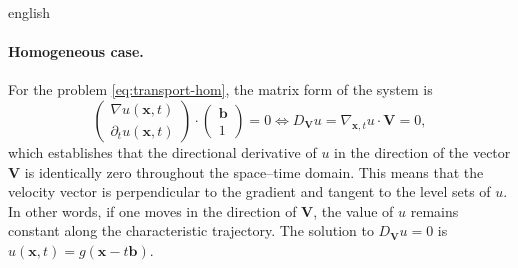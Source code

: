 \documentclass[../0000.tex]{subfiles}
\begin{document}
\begin{hyphenrules}{english}
\paragraph{Homogeneous case.}
For the problem \eqref{eq:transport-hom}, the matrix form of the system is
\begin{equation}
  \begin{pmatrix}\nabla u(\mathbf{x},t)\\ \partial_t u(\mathbf{x},t)\end{pmatrix}\cdot
  \begin{pmatrix}\mathbf{b}\\ 1\end{pmatrix}=0
  \iff D_{\mathbf{V}}u=\nabla_{\mathbf{x},t}u\cdot\mathbf{V}=0,
  \label{eq:transport-matrix}
\end{equation}
which establishes that the directional derivative of $u$ in the direction of the vector $\mathbf{V}$ is
identically zero throughout the space--time domain. This means that the velocity vector is perpendicular
to the gradient and tangent to the level sets of $u$. In other words, if one moves in the direction of
$\mathbf{V}$, the value of $u$ remains constant along the characteristic trajectory. The solution to
$D_{\mathbf{V}}u=0$ is $u(\mathbf{x},t)=g(\mathbf{x}-t\mathbf{b})$.


\end{hyphenrules}
\end{document}
